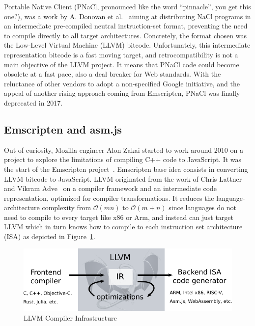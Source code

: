 Portable Native Client (PNaCl, pronounced like the word ``pinnacle'', you get this one?),
was a work by A. Donovan et al.~\cite{donovan2010pnacl} aiming at distributing
NaCl programs in an intermediate pre-compiled neutral instruction-set format,
preventing the need to compile directly to all target architectures.
Concretely, the format chosen was the Low-Level Virtual Machine (LLVM) bitcode.
Unfortunately, this intermediate representation bitcode is a fast moving target,
and retrocompatibility is not a main objective of the LLVM project.
It means that PNaCl code could become obsolete at a fast pace,
also a deal breaker for Web standards.
With the reluctance of other vendors to adopt a non-specified Google initiative,
and the appeal of another rising approach coming from Emscripten,
PNaCl was finally deprecated in 2017.

\subsection{Emscripten and asm.js}%
\label{sub:emscripten-asmjs}

Out of curiosity, Mozilla engineer Alon Zakai started to work around 2010
on a project to explore the limitations of compiling C++ code to JavaScript.
It was the start of the Emscripten project~\cite{zakai2011emscripten}.
Emscripten base idea consists in converting LLVM bitcode to JavaScript.
LLVM originated from the work of
Chris Lattner and Vikram Adve~\cite{lattner2004llvm} on a compiler framework
and an intermediate code representation, optimized for compiler transformations.
It reduces the language-architecture complexity from $\mathcal{O}(mn)$ to $\mathcal{O}(m+n)$
since languages do not need to compile to every target like x86 or Arm,
and instead can just target LLVM which in turn knows how to compile to each
instruction set architecture (ISA) as depicted in Figure~\ref{fig:llvm}.

\begin{figure}[h]
	\centering
	\includegraphics[width=\linewidth]{assets/img/llvm.pdf}
	\caption{LLVM Compiler Infrastructure}%
	\label{fig:llvm}
\end{figure}

